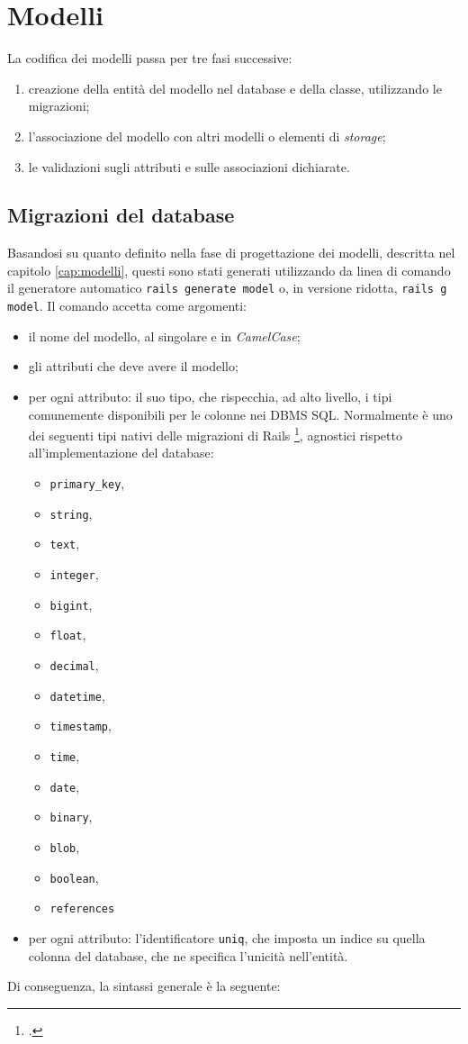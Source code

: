 \section{Modelli}
La codifica dei modelli passa per tre fasi successive:
\begin{enumerate}
	\item creazione della entità del modello nel database e della classe, utilizzando le migrazioni;
	\item l'associazione del modello con altri modelli o elementi di \emph{storage};
	\item le validazioni sugli attributi e sulle associazioni dichiarate.
\end{enumerate}

\subsection{Migrazioni del database}
Basandosi su quanto definito nella fase di progettazione dei modelli, descritta nel capitolo \ref{cap:modelli}, questi sono stati generati utilizzando da linea di comando il generatore automatico \verb|rails generate model| o, in versione ridotta, \verb|rails g model|. Il comando accetta come argomenti:
\begin{itemize}
	\item il nome del modello, al singolare e in \emph{CamelCase};
	\item gli attributi che deve avere il modello;
	\item per ogni attributo: il suo tipo, che rispecchia, ad alto livello, i tipi comunemente disponibili per le colonne nei DBMS SQL. Normalmente è uno dei seguenti tipi nativi delle migrazioni di Rails \footcite{site:migration-types}, agnostici rispetto all'implementazione del database:
	\begin{itemize}
		\item \verb|primary_key|,
		\item \verb|string|,
		\item \verb|text|,
		\item \verb|integer|,
		\item \verb|bigint|,
		\item \verb|float|,
		\item \verb|decimal|,
		\item \verb|datetime|,
		\item \verb|timestamp|,
		\item \verb|time|,
		\item \verb|date|,
		\item \verb|binary|,
		\item \verb|blob|,
		\item \verb|boolean|,
		\item \verb|references|
	\end{itemize}
	\item per ogni attributo: l'identificatore \verb|uniq|, che imposta un indice su quella colonna del database, che ne specifica l'unicità nell'entità.
\end{itemize}
Di conseguenza, la sintassi generale è la seguente:

